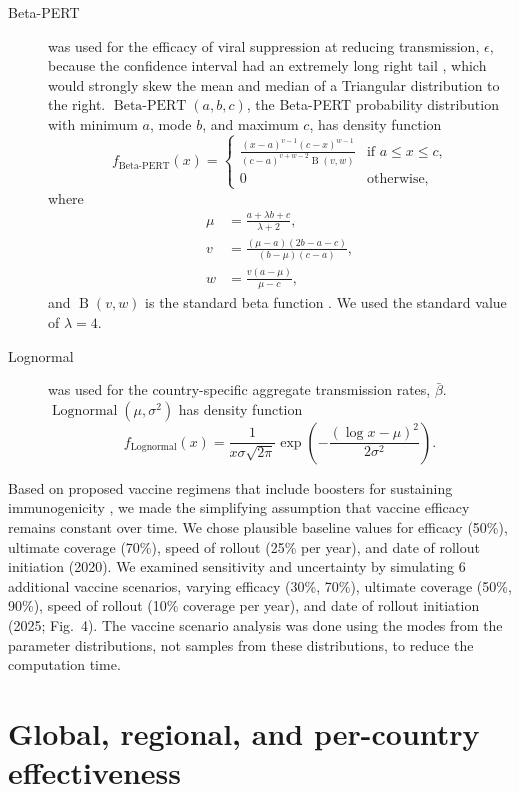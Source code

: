 \documentclass{article}
\DeclareMathOperator{\Lognormal}{Lognormal}
\DeclareMathOperator{\BetaPERT}{Beta-PERT}
\DeclareMathOperator{\Beta}{B}
\begin{document}
\begin{description}
\item[Beta-PERT] was used for the efficacy of viral suppression at
  reducing transmission, $\epsilon$, because the confidence interval
  had an extremely long right tail \cite{Donnell2010-xo}, which would
  strongly skew the mean and median of a Triangular distribution to
  the right.  $\BetaPERT(a, b, c)$, the Beta-PERT probability
  distribution \cite{malcom1959} with minimum $a$, mode $b$, and
  maximum $c$, has density function
  \begin{equation}
    \label{BetaPERT}
    f_{\BetaPERT}(x) =
    \begin{cases}
      \frac{(x - a)^{v - 1} (c - x)^{w - 1}}{(c - a)^{v + w - 2} \Beta(v, w)}
      & \text{if $a \leq x \leq c$,}
      \\
      0 & \text{otherwise,}
    \end{cases}
  \end{equation}
  where
  \begin{equation}
    \begin{split}
      \mu &= \frac{a + \lambda b + c}{\lambda + 2},
      \\
      v &= \frac{(\mu - a)(2 b - a - c)}{(b - \mu) (c - a)},
      \\
      w &= \frac{v (a - \mu)}{\mu - c},
    \end{split}
  \end{equation}
  and $\Beta(v, w)$ is the standard beta function
  \cite[\S6.2]{davis1972}.
  We used the standard value of $\lambda = 4$.

\item[Lognormal] was used for the country-specific aggregate
  transmission rates, $\bar{\beta}$.  $\Lognormal(\mu, \sigma^2)$
  has density function
  \begin{equation}
    f_{\Lognormal}(x) = \frac{1}{x \sigma \sqrt{2 \pi}}
    \exp\left(- \frac{\left(\log x - \mu\right)^2}{2 \sigma^2}\right).
  \end{equation}
\end{description}

Based on proposed vaccine regimens that include boosters for
sustaining immunogenicity \cite{gray_2016}, we made the simplifying
assumption that vaccine efficacy remains constant over time. We chose
plausible baseline values for efficacy (50\%), ultimate coverage
(70\%), speed of rollout (25\% per year), and date of rollout
initiation (2020). We examined sensitivity and uncertainty by
simulating 6 additional vaccine scenarios, varying efficacy (30\%,
70\%), ultimate coverage (50\%, 90\%), speed of rollout (10\% coverage
per year), and date of rollout initiation (2025; Fig.~4). The vaccine
scenario analysis was done using the modes from the parameter
distributions, not samples from these distributions, to reduce the
computation time.


%
%



\newpage
\vspace*{3in}
\section{Global, regional, and per-country effectiveness}
\label{effectiveness_all_plots}
\newpage


\end{document}
